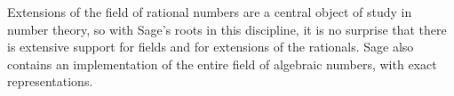 Extensions of the field of rational numbers are a central object of study in number theory, so with Sage's roots in this discipline, it is no surprise that there is extensive support for fields and for extensions of the rationals.  Sage also contains an implementation of the entire field of algebraic numbers, with exact representations.